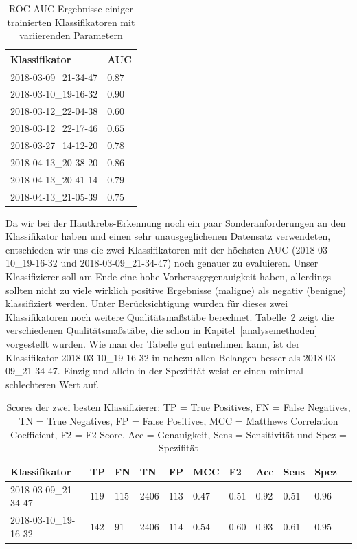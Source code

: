 \begin{table}[htb!]
\begin{center}
\begin{tabular}{ll}
	\toprule
 	Klassifikator  & AUC\\
	\midrule
  	2018-03-09\_21-34-47 &   $0.87$\\
    2018-03-10\_19-16-32 &   $0.90$\\
    2018-03-12\_22-04-38 &   $0.60$\\
    2018-03-12\_22-17-46 &   $0.65$\\
    2018-03-27\_14-12-20 &   $0.78$\\
    2018-04-13\_20-38-20 &   $0.86$\\
    2018-04-13\_20-41-14 &   $0.79$\\
    2018-04-13\_21-05-39 &   $0.75$\\
 \bottomrule
 \end{tabular}
 \end{center}
  \caption{ROC-AUC Ergebnisse einiger trainierten Klassifikatoren mit variierenden Parametern}
 \label{tab:auc}
 \end{table}
 
Da wir bei der Hautkrebs-Erkennung noch ein paar Sonderanforderungen an den Klassifikator haben und einen sehr unausgeglichenen Datensatz verwendeten, entschieden wir uns die zwei Klassifikatoren mit der höchsten AUC (2018-03-10\_19-16-32 und 2018-03-09\_21-34-47) noch genauer zu evaluieren. Unser Klassifizierer soll am Ende  eine hohe Vorhersagegenauigkeit haben, allerdings sollten nicht zu viele wirklich positive Ergebnisse (maligne) als negativ (benigne) klassifiziert werden. Unter Berücksichtigung wurden für dieses zwei Klassifikatoren noch weitere Qualitätsmaßstäbe berechnet. Tabelle~\ref{tab:scores} zeigt die verschiedenen Qualitätsmaßstäbe, die schon in Kapitel~\ref{analysemethoden} vorgestellt wurden. Wie man der Tabelle gut entnehmen kann, ist der Klassifikator 2018-03-10\_19-16-32 in nahezu allen Belangen besser als 2018-03-09\_21-34-47. Einzig und allein in der Spezifität weist er einen minimal schlechteren Wert auf.

\begin{table}[htb!]
\begin{center}
\begin{tabular}{lllllllllll}
	\toprule
 	Klassifikator  & TP & FN & TN & FP & MCC & F2 & Acc & Sens & Spez\\
	\midrule
	2018-03-09\_21-34-47 & $119$ &	$115$ &	$2406$ &	$113$ &	$0.47$ &	$0.51$&	$0.92$ &	$0.51$ & $0.96$\\
    2018-03-10\_19-16-32 & $142$&	$91$ &	$2406$ &	$114$ &	$0.54$ 	&$0.60$	&$0.93$	&$0.61$&	$0.95$ \\
 \bottomrule
 \end{tabular}
 \end{center}
  \caption{Scores der zwei besten Klassifizierer: TP = True Positives, FN = False Negatives, TN = True Negatives, FP = False Positives, MCC = Matthews Correlation Coefficient, F2 = F2-Score, Acc = Genauigkeit, Sens = Sensitivität und Spez = Spezifität }
 \label{tab:scores}
 \end{table}
 
